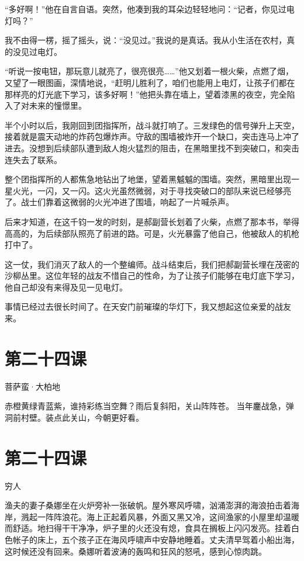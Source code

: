 \documentclass[12pt,UTF8]{ctexbook}
\begin{document}
“多好啊！”他在自言自语。突然，他凑到我的耳朵边轻轻地问：“记者，你见过电灯吗？”

我不由得一楞，摇了摇头，说：“没见过。”我说的是真话。我从小生活在农村，真的没见过电灯。

“听说一按电钮，那玩意儿就亮了，很亮很亮……”他又划着一根火柴，点燃了烟，又望了一眼图画，深情地说，“赶明儿胜利了，咱们也能用上电灯，让孩子们都在那样亮的灯光底下学习，该多好啊！”他把头靠在墙上，望着漆黑的夜空，完全陷入了对未来的憧憬里。

半个小时以后，我刚回到团指挥所，战斗就打响了。三发绿色的信号弹升上天空，接着就是震天动地的炸药包爆炸声。守敌的围墙被炸开一个缺口，突击连马上冲了进去。没想到后续部队遭到敌人炮火猛烈的阻击，在黑暗里找不到突破口，和突击连失去了联系。

整个团指挥所的人都焦急地钻出了地堡，望着黑魆魆的围墙。突然，黑暗里出现一星火光，一闪，又一闪。这火光虽然微弱，对于寻找突破口的部队来说已经够亮了。战士们靠着这微弱的火光冲进了围墙，响起了一片喊杀声。

后来才知道，在这千钧一发的时刻，是郝副营长划着了火柴，点燃了那本书，举得高高的，为后续部队照亮了前进的路。可是，火光暴露了他自己，他被敌人的机枪打中了。

这一仗，我们消灭了敌人的一个整编师。战斗结束后，我们把郝副营长埋在茂密的沙柳丛里。这位年轻的战友不惜自己的性命，为了让孩子们能够在电灯底下学习，他自己却没有来得及见一见电灯。

事情已经过去很长时间了。在天安门前璀璨的华灯下，我又想起这位亲爱的战友来。

\section{第二十四课}

菩萨蛮·大柏地

赤橙黄绿青蓝紫，谁持彩练当空舞？雨后复斜阳，关山阵阵苍。
当年鏖战急，弹洞前村壁。装点此关山，今朝更好看。

\section{第二十四课}

穷人

渔夫的妻子桑娜坐在火炉旁补一张破帆。屋外寒风呼啸，汹涌澎湃的海浪拍击着海岸，溅起一阵阵浪花。海上正起着风暴，外面又黑又冷，这间渔家的小屋里却温暖而舒适。地扫得干干净净，炉子里的火还没有熄，食具在搁板上闪闪发亮。挂着白色帐子的床上，五个孩子正在海风呼啸声中安静地睡着。丈夫清早驾着小船出海，这时候还没有回来。桑娜听着波涛的轰鸣和狂风的怒吼，感到心惊肉跳。
\end{document}
